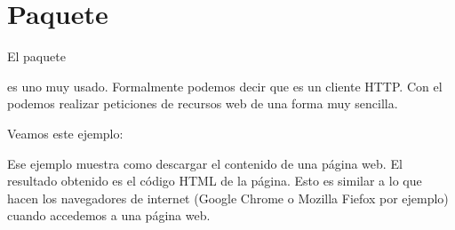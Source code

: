 \documentclass[a5paper,9pt,spanish]{sphinxmanual}
\begin{document}
\sphinxstepscope


\chapter{Paquete }
\label{\detokenize{requests:paquete-requests}}\label{\detokenize{requests::doc}}
\sphinxAtStartPar
El paquete %
\begin{footnote}[35]\sphinxAtStartFootnote
{}
%
\end{footnote} es uno muy usado.
Formalmente podemos decir que es un cliente HTTP. Con el podemos realizar
peticiones de recursos web de una forma muy sencilla.

\sphinxAtStartPar
Veamos este ejemplo:

\begin{sphinxVerbatim}[commandchars=\\\{\}]
 

  
  
  

\PYG{p}{[}\PYG{p}{]}

   
\end{sphinxVerbatim}

\sphinxAtStartPar
Ese ejemplo muestra como descargar el contenido de una página web.
El resultado obtenido es el código HTML de la página.
Esto es similar a lo que hacen los navegadores de internet (Google
Chrome o Mozilla Fiefox por ejemplo) cuando accedemos a una página web.
\end{document}
